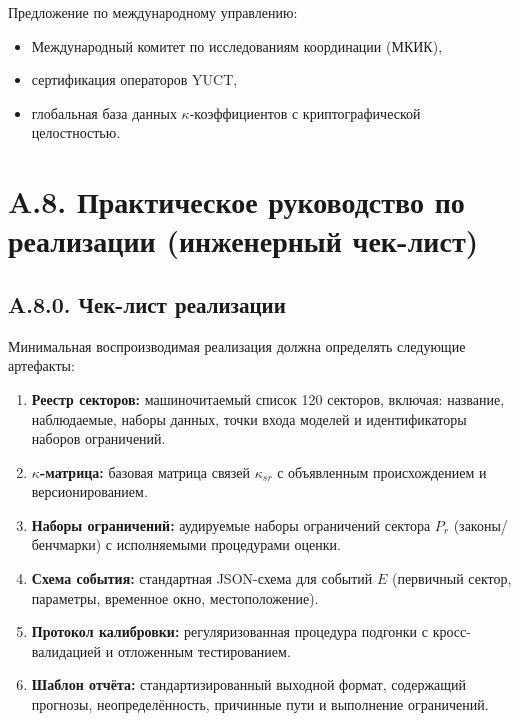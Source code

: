 \documentclass[11pt,a4paper]{article}
\begin{document}
	Предложение по международному управлению:
	\begin{itemize}[leftmargin=*]
		\item Международный комитет по исследованиям координации (МКИК),
		\item сертификация операторов YUCT,
		\item глобальная база данных $\kappa$-коэффициентов с криптографической целостностью.
	\end{itemize}
	
	\section*{A.8. Практическое руководство по реализации (инженерный чек-лист)}
	
	\subsection*{A.8.0. Чек-лист реализации}
	Минимальная воспроизводимая реализация должна определять следующие артефакты:
	
	\begin{enumerate}[leftmargin=*]
		\item \textbf{Реестр секторов:} машиночитаемый список 120 секторов, включая: название, наблюдаемые, наборы данных, точки входа моделей и идентификаторы наборов ограничений.
		\item \textbf{$\kappa$-матрица:} базовая матрица связей $\kappa_{sr}$ с объявленным происхождением и версионированием.
		\item \textbf{Наборы ограничений:} аудируемые наборы ограничений сектора $P_r$ (законы/бенчмарки) с исполняемыми процедурами оценки.
		\item \textbf{Схема события:} стандартная JSON-схема для событий $E$ (первичный сектор, параметры, временное окно, местоположение).
		\item \textbf{Протокол калибровки:} регуляризованная процедура подгонки с кросс-валидацией и отложенным тестированием.
		\item \textbf{Шаблон отчёта:} стандартизированный выходной формат, содержащий прогнозы, неопределённость, причинные пути и выполнение ограничений.
	\end{enumerate}
	
\end{document}
